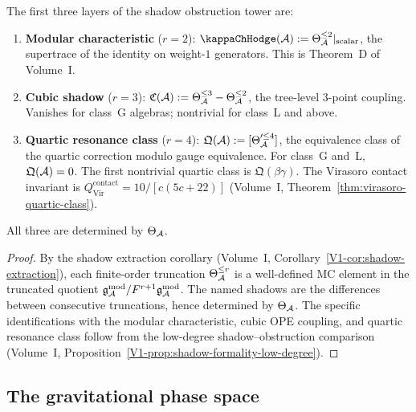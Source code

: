 \begin{proposition}
The first three layers of the shadow obstruction tower are:
\begin{enumerate}[label=\textup{(\roman*)}]
\item \textbf{Modular characteristic} ($r=2$):
 $\kappaChHodge(\cA) := \Theta_\cA^{\le 2}|_{\text{scalar}}$, the
 supertrace of the identity on weight-$1$ generators. This is
 Theorem~D of Volume~I.
\item \textbf{Cubic shadow} ($r=3$):
 $\mathfrak{C}(\mathcal{A}) := \Theta_{\mathcal{A}}^{\le 3} - \Theta_{\mathcal{A}}^{\le 2}$,
 the tree-level $3$-point coupling. Vanishes for class~G algebras;
 nontrivial for class~L and above.
\item \textbf{Quartic resonance class} ($r=4$):
 $\mathfrak{Q}(\mathcal{A}) := [\Theta'^{\le 4}_{\mathcal{A}}]$, the equivalence class
 of the quartic correction modulo gauge equivalence. For class~G
 and~L, $\mathfrak{Q}(\mathcal{A}) = 0$. The first nontrivial quartic
 class is $\mathfrak{Q}(\beta\gamma)$.
 The Virasoro contact invariant is
 $Q^{\mathrm{contact}}_{\mathrm{Vir}} = 10/[c(5c+22)]$
 (Volume~I, Theorem~\ref{thm:virasoro-quartic-class}).
\end{enumerate}
All three are determined by $\Theta_{\mathcal{A}}$.
\end{proposition}

\begin{proof}
By the shadow extraction corollary
(Volume~I, Corollary~\ref*{V1-cor:shadow-extraction}), each finite-order
truncation $\Theta_{\mathcal{A}}^{\le r}$ is a well-defined MC element in the
truncated quotient $\mathfrak{g}_{\mathcal{A}}^{\mathrm{mod}} / F^{r+1}\mathfrak{g}_{\mathcal{A}}^{\mathrm{mod}}$. The named shadows are
the differences between consecutive truncations, hence determined
by $\Theta_{\mathcal{A}}$. The specific identifications with the modular
characteristic, cubic OPE coupling, and quartic resonance class
follow from the low-degree shadow--obstruction comparison
(Volume~I, Proposition~\ref{V1-prop:shadow-formality-low-degree}).
\end{proof}


\subsection{The gravitational phase space}

